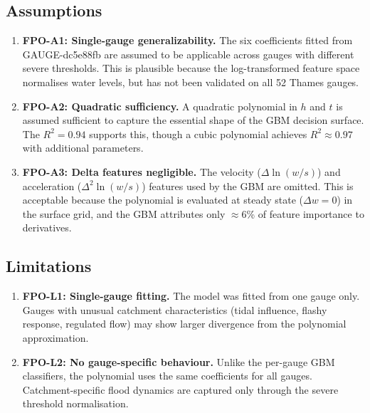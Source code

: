 \documentclass[11pt,a4paper]{article}
\begin{document}
\subsection{Assumptions}
\begin{enumerate}[nosep]
    \item \textbf{FPO-A1: Single-gauge generalizability.}
          The six coefficients fitted from GAUGE-dc5e88fb are assumed to be
          applicable across gauges with different severe thresholds. This is
          plausible because the log-transformed feature space normalises
          water levels, but has not been validated on all 52 Thames gauges.

    \item \textbf{FPO-A2: Quadratic sufficiency.}
          A quadratic polynomial in $h$ and $t$ is assumed sufficient to
          capture the essential shape of the GBM decision surface. The
          $R^2 = 0.94$ supports this, though a cubic polynomial achieves
          $R^2 \approx 0.97$ with additional parameters.

    \item \textbf{FPO-A3: Delta features negligible.}
          The velocity ($\Delta\ln(w/s)$) and acceleration
          ($\Delta^2\ln(w/s)$) features used by the GBM are omitted. This
          is acceptable because the polynomial is evaluated at steady state
          ($\Delta w = 0$) in the surface grid, and the GBM attributes only
          $\approx$6\% of feature importance to derivatives.
\end{enumerate}

\subsection{Limitations}
\begin{enumerate}[nosep]
    \item \textbf{FPO-L1: Single-gauge fitting.}
          The model was fitted from one gauge only. Gauges with unusual
          catchment characteristics (tidal influence, flashy response,
          regulated flow) may show larger divergence from the polynomial
          approximation.

    \item \textbf{FPO-L2: No gauge-specific behaviour.}
          Unlike the per-gauge GBM classifiers, the polynomial uses the same
          coefficients for all gauges. Catchment-specific flood dynamics are
          captured only through the severe threshold normalisation.
\end{enumerate}
\end{document}
